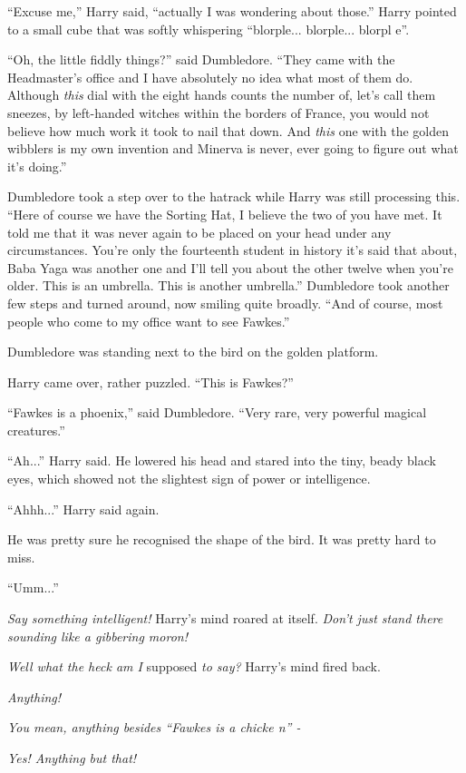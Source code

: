 ``Excuse me,'' Harry said, ``actually I was wondering about those.'' Harry pointed to a small cube that was softly whispering ``blorple... blorple... blorpl e''.

``Oh, the little fiddly things?'' said Dumbledore. ``They came with the Headmaster's office and I have absolutely no idea what most of them do. Although \emph{this} dial with the eight hands counts the number of, let's call them sneezes, by left-handed witches within the borders of France, you would not believe how much work it took to nail that down. And \emph{this} one with the golden wibblers is my own invention and Minerva is never, ever going to figure out what it's doing.''

Dumbledore took a step over to the hatrack while Harry was still processing this. ``Here of course we have the Sorting Hat, I believe the two of you have met. It told me that it was never again to be placed on your head under any circumstances. You're only the fourteenth student in history it's said that about, Baba Yaga was another one and I'll tell you about the other twelve when you're older. This is an umbrella. This is another umbrella.'' Dumbledore took another few steps and turned around, now smiling quite broadly. ``And of course, most people who come to my office want to see Fawkes.''

Dumbledore was standing next to the bird on the golden platform.

Harry came over, rather puzzled. ``This is Fawkes?''

``Fawkes is a phoenix,'' said Dumbledore. ``Very rare, very powerful magical creatures.''

``Ah...'' Harry said. He lowered his head and stared into the tiny, beady black eyes, which showed not the slightest sign of power or intelligence.

``Ahhh...'' Harry said again.

He was pretty sure he recognised the shape of the bird. It was pretty hard to miss.

``Umm...''

\emph{Say something intelligent!} Harry's mind roared at itself. \emph{Don't just stand there sounding like a gibbering moron!}

\emph{Well what the heck am I} supposed \emph{to say?} Harry's mind fired back.

\emph{Anything!}

\emph{You mean, anything besides ``Fawkes is a chicke n'' -}

\emph{Yes! Anything but that!}

